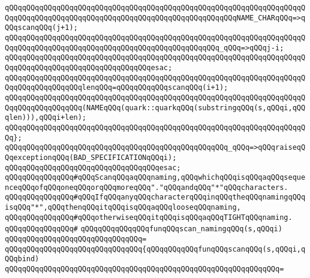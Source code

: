 \verb|qQQqqQQqqQQqqQQqqQQqqQQqqQQqqQQqqQQqqQQqqQQqqQQqqQQqqQQqqQQqqQQqqQQqqQQqqQQqqQQqqQQqqQQqqQQqqQQqqQQqqQQqqQQqqQQqqQQqqQQqqQQqNAME_CHARqQQq=>qQQqscanqQQq(j+1);|\newline
\verb|qQQqqQQqqQQqqQQqqQQqqQQqqQQqqQQqqQQqqQQqqQQqqQQqqQQqqQQqqQQqqQQqqQQqqQQqqQQqqQQqqQQqqQQqqQQqqQQqqQQqqQQqqQQqqQQqqQQqqQQq_qQQq=>qQQqj-i;|\newline
\verb|qQQqqQQqqQQqqQQqqQQqqQQqqQQqqQQqqQQqqQQqqQQqqQQqqQQqqQQqqQQqqQQqqQQqqQQqqQQqqQQqqQQqqQQqqQQqqQQqqQQqqQQqesac;|\newline
\newline
\verb|qQQqqQQqqQQqqQQqqQQqqQQqqQQqqQQqqQQqqQQqqQQqqQQqqQQqqQQqqQQqqQQqqQQqqQQqqQQqqQQqqQQqqQQqlenqQQq=qQQqqQQqqQQqscanqQQq(i+1);|\newline
\newline
\verb|qQQqqQQqqQQqqQQqqQQqqQQqqQQqqQQqqQQqqQQqqQQqqQQqqQQqqQQqqQQqqQQqqQQqqQQqqQQqqQQqqQQqqQQq(NAMEqQQq(quark::quarkqQQq(substringqQQq(s,qQQqi,qQQqlen))),qQQqi+len);|\newline
\verb|qQQqqQQqqQQqqQQqqQQqqQQqqQQqqQQqqQQqqQQqqQQqqQQqqQQqqQQqqQQqqQQqqQQqqQQq};|\newline
\newline
\verb|qQQqqQQqqQQqqQQqqQQqqQQqqQQqqQQqqQQqqQQqqQQqqQQqqQQq_qQQq=>qQQqraiseqQQqexceptionqQQq(BAD_SPECIFICATIONqQQqi);|\newline
\verb|qQQqqQQqqQQqqQQqqQQqqQQqqQQqqQQqqQQqesac;|\newline
\newline
\newline
\verb|qQQqqQQqqQQqqQQq#qQQqScanqQQqaqQQqnaming,qQQqwhichqQQqisqQQqaqQQqsequenceqQQqofqQQqoneqQQqorqQQqmoreqQQq"."qQQqandqQQq"*"qQQqcharacters.|\newline
\verb|qQQqqQQqqQQqqQQq#qQQqIfqQQqanyqQQqcharacterqQQqinqQQqtheqQQqnamingqQQqisqQQq"*",qQQqthenqQQqitqQQqisqQQqaqQQqlooseqQQqnaming,|\newline
\verb|qQQqqQQqqQQqqQQq#qQQqotherwiseqQQqitqQQqisqQQqaqQQqTIGHTqQQqnaming.|\newline
\verb|qQQqqQQqqQQqqQQq#|\newline
\verb|qQQqqQQqqQQqqQQqfunqQQqscan_namingqQQq(s,qQQqi)|\newline
\verb|qQQqqQQqqQQqqQQqqQQqqQQqqQQqqQQq=|\newline
\verb|qQQqqQQqqQQqqQQqqQQqqQQqqQQqqQQq{qQQqqQQqqQQqfunqQQqscanqQQq(s,qQQqi,qQQqbind)|\newline
\verb|qQQqqQQqqQQqqQQqqQQqqQQqqQQqqQQqqQQqqQQqqQQqqQQqqQQqqQQqqQQqqQQq=|\newline
